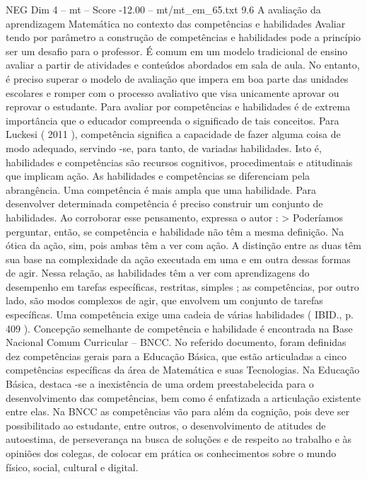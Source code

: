 \begin{textsample}{NEG Dim 4 – mt – Score -12.00 – mt/mt\_em\_65.txt}  \label{ex:f4_neg_111}
9.6 A avaliação da aprendizagem Matemática no contexto das competências e habilidades Avaliar tendo por parâmetro a construção de competências e habilidades pode a princípio ser um desafio para o professor.
É comum em um modelo tradicional de ensino avaliar a partir de atividades e conteúdos abordados em sala de aula.
No entanto, é preciso superar o modelo de avaliação que impera em boa parte das unidades escolares e romper com o processo avaliativo que visa unicamente aprovar ou reprovar o estudante.
Para avaliar por competências e habilidades é de extrema importância que o educador compreenda o significado de tais conceitos.
Para Luckesi ( 2011 ), competência significa a capacidade de fazer alguma coisa de modo adequado, servindo -se, para tanto, de variadas habilidades.
Isto é, habilidades e competências são recursos cognitivos, procedimentais e atitudinais que implicam ação.
As habilidades e competências se diferenciam pela abrangência.
Uma competência é mais ampla que uma habilidade.
Para desenvolver determinada competência é preciso construir um conjunto de habilidades.
Ao corroborar esse pensamento, expressa o autor : > Poderíamos perguntar, então, se competência e habilidade não têm a mesma definição.
Na ótica da ação, sim, pois ambas têm a ver com ação.
A distinção entre as duas têm sua base na complexidade da ação executada em uma e em outra dessas formas de agir.
Nessa relação, as habilidades têm a ver com aprendizagens do desempenho em tarefas específicas, restritas, simples ; as competências, por outro lado, são modos complexos de agir, que envolvem um conjunto de tarefas específicas.
Uma competência exige uma cadeia de várias habilidades ( IBID., p. 409 ).
Concepção semelhante de competência e habilidade é encontrada na Base Nacional Comum Curricular – BNCC.
No referido documento, foram definidas dez competências gerais para a Educação Básica, que estão articuladas a cinco competências específicas da área de Matemática e suas Tecnologias.
Na Educação Básica, destaca -se a inexistência de uma ordem preestabelecida para o desenvolvimento das competências, bem como é enfatizada a articulação existente entre elas.
Na BNCC as competências vão para além da cognição, pois deve ser possibilitado ao estudante, entre outros, o desenvolvimento de atitudes de autoestima, de perseverança na busca de soluções e de respeito ao trabalho e às opiniões dos colegas, de colocar em prática os conhecimentos sobre o mundo físico, social, cultural e digital.

\end{textsample}
